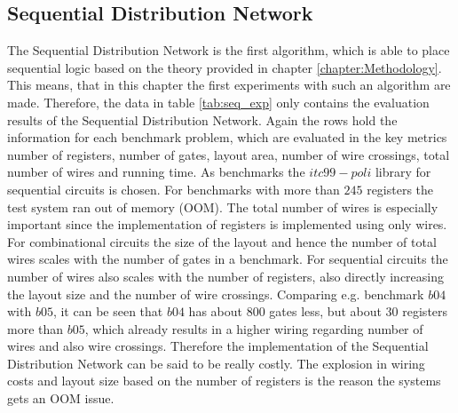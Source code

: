 \newpage
\subsection{Sequential Distribution Network}

The Sequential Distribution Network is the first algorithm, which is able to place sequential logic based on the theory provided in chapter \ref{chapter:Methodology}. This means, that in this chapter the first experiments with such an algorithm are made. Therefore, the data in table \ref{tab:seq_exp} only contains the evaluation results of the Sequential Distribution Network. Again the rows hold the information for each benchmark problem, which are evaluated in the key metrics number of registers, number of gates, layout area, number of wire crossings, total number of wires and running time. As benchmarks the $itc99-poli$ library for sequential circuits is chosen. For benchmarks with more than $245$ registers the test system ran out of memory (OOM).
The total number of wires is especially important since the implementation of registers is implemented using only wires. For combinational circuits the size of the layout and hence the number of total wires scales with the number of gates in a benchmark. For sequential circuits the number of wires also scales with the number of registers, also directly increasing the layout size and the number of wire crossings. Comparing e.g. benchmark $b04$ with $b05$, it can be seen that $b04$ has about $800$ gates less, but about $30$ registers more than $b05$, which already results in a higher wiring regarding number of wires and also wire crossings. Therefore the implementation of the Sequential Distribution Network can be said to be really costly. The explosion in wiring costs and layout size based on the number of registers is the reason the systems gets an OOM issue.
%
